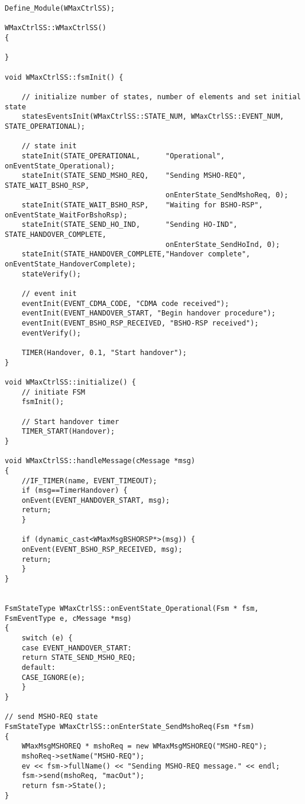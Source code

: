 \begin{lstlisting}
Define_Module(WMaxCtrlSS);

WMaxCtrlSS::WMaxCtrlSS()
{

}

void WMaxCtrlSS::fsmInit() {

    // initialize number of states, number of elements and set initial state
    statesEventsInit(WMaxCtrlSS::STATE_NUM, WMaxCtrlSS::EVENT_NUM, STATE_OPERATIONAL);

    // state init
    stateInit(STATE_OPERATIONAL,      "Operational", onEventState_Operational);
    stateInit(STATE_SEND_MSHO_REQ,    "Sending MSHO-REQ", STATE_WAIT_BSHO_RSP, 
                                      onEnterState_SendMshoReq, 0);
    stateInit(STATE_WAIT_BSHO_RSP,    "Waiting for BSHO-RSP", onEventState_WaitForBshoRsp);
    stateInit(STATE_SEND_HO_IND,      "Sending HO-IND", STATE_HANDOVER_COMPLETE, 
                                      onEnterState_SendHoInd, 0);
    stateInit(STATE_HANDOVER_COMPLETE,"Handover complete", onEventState_HandoverComplete);
    stateVerify();

    // event init
    eventInit(EVENT_CDMA_CODE, "CDMA code received");
    eventInit(EVENT_HANDOVER_START, "Begin handover procedure");
    eventInit(EVENT_BSHO_RSP_RECEIVED, "BSHO-RSP received");
    eventVerify();

    TIMER(Handover, 0.1, "Start handover");
}

void WMaxCtrlSS::initialize() {
    // initiate FSM
    fsmInit();

    // Start handover timer
    TIMER_START(Handover);
}

void WMaxCtrlSS::handleMessage(cMessage *msg) 
{
    //IF_TIMER(name, EVENT_TIMEOUT);
    if (msg==TimerHandover) {
	onEvent(EVENT_HANDOVER_START, msg);
	return;
    }

    if (dynamic_cast<WMaxMsgBSHORSP*>(msg)) {
	onEvent(EVENT_BSHO_RSP_RECEIVED, msg);
	return;
    }
}


FsmStateType WMaxCtrlSS::onEventState_Operational(Fsm * fsm, FsmEventType e, cMessage *msg)
{
    switch (e) {
    case EVENT_HANDOVER_START:
	return STATE_SEND_MSHO_REQ;
    default:
	CASE_IGNORE(e);
    }
}

// send MSHO-REQ state
FsmStateType WMaxCtrlSS::onEnterState_SendMshoReq(Fsm *fsm)
{
    WMaxMsgMSHOREQ * mshoReq = new WMaxMsgMSHOREQ("MSHO-REQ");
    mshoReq->setName("MSHO-REQ");
    ev << fsm->fullName() << "Sending MSHO-REQ message." << endl;
    fsm->send(mshoReq, "macOut");
    return fsm->State();
}


\end{lstlisting}
